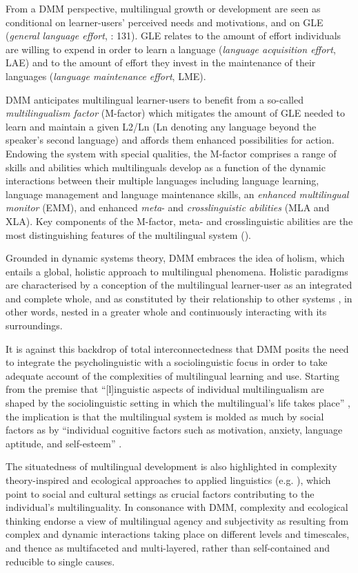 \documentclass[output=paper]{../langscibook}
\begin{document}
From a DMM perspective, multilingual growth or development are seen as conditional on learner-users’ perceived needs and motivations, and on GLE (\emph{general language effort}, \citealt{HerdinaJessner2002}: 131). GLE relates to the amount of effort individuals are willing to expend in order to learn a language (\emph{language acquisition effort}, LAE) and to the amount of effort they invest in the maintenance of their languages (\emph{language maintenance effort}, LME). 

DMM anticipates multilingual learner-users to benefit from a so-called \emph{multilingualism factor} (M-factor) which mitigates the amount of GLE needed to learn and maintain a given L2/Ln (Ln denoting any language beyond the speaker’s second language) and affords them enhanced possibilities for action.  Endowing the system with special qualities, the M-factor comprises a range of skills and abilities which multilinguals develop as a function of the dynamic interactions between their multiple languages including language learning, language management and language maintenance skills, an \emph{enhanced multilingual monitor} (EMM), and enhanced \emph{meta}- and \emph{crosslinguistic abilities} (MLA and XLA). Key components of the M-factor, meta- and crosslinguistic abilities are the most distinguishing features of the multilingual system (\citealt{JessnerEtAl2018}). 

Grounded in dynamic systems theory, DMM embraces the idea of holism, which entails a global, holistic approach to multilingual phenomena. Holistic paradigms are characterised by a conception of the multilingual learner-user as an integrated and complete whole, and as constituted by their relationship to other systems \citep[44]{Philips2000}, in other words, nested in a greater whole and continuously interacting with its surroundings. 

It is against this backdrop of total interconnectedness that DMM posits the need to integrate the psycholinguistic with a sociolinguistic focus in order to take adequate account of the complexities of multilingual learning and use. Starting from the premise that “[l]inguistic aspects of individual multilingualism are shaped by the sociolinguistic setting in which the multilingual’s life takes place” \citep[273]{Jessner2008}, the implication is that the multilingual system is molded as much by social factors as by “individual cognitive factors such as motivation, anxiety, language aptitude, and self-esteem” \citep[274]{Jessner2008}. 

The situatedness of multilingual development is also highlighted in complexity theory-inspired and ecological approaches to applied linguistics (e.g. \citealt{Kramsch2012,Larsen-FreemanCameron2008,LaoireAronin2004}), which point to social and cultural settings as crucial factors contributing to the individual’s multilinguality. In consonance with DMM, complexity and ecological thinking endorse a view of multilingual agency and subjectivity as resulting from complex and dynamic interactions taking place on different levels and timescales, and thence as multifaceted and multi-layered, rather than self-contained and reducible to single causes.
\end{document}

